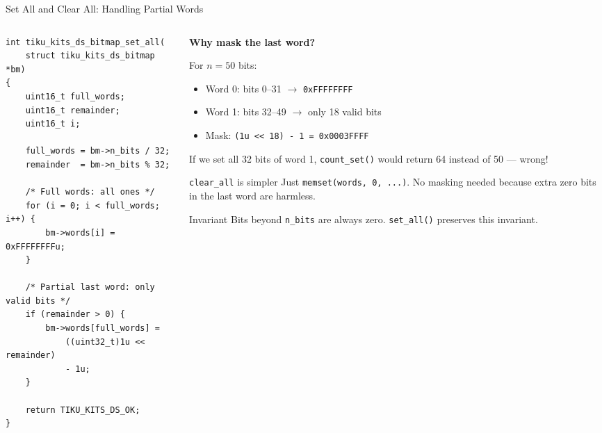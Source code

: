 \documentclass[aspectratio=169, 10pt]{beamer}
\begin{document}
\begin{frame}[fragile]{Set All and Clear All: Handling Partial Words}
\begin{columns}[T]
\begin{column}{0.48\textwidth}
\begin{lstlisting}[style=cstyle,
  title={set\_all --- masks the last word}]
int tiku_kits_ds_bitmap_set_all(
    struct tiku_kits_ds_bitmap *bm)
{
    uint16_t full_words;
    uint16_t remainder;
    uint16_t i;

    full_words = bm->n_bits / 32;
    remainder  = bm->n_bits % 32;

    /* Full words: all ones */
    for (i = 0; i < full_words; i++) {
        bm->words[i] = 0xFFFFFFFFu;
    }

    /* Partial last word: only valid bits */
    if (remainder > 0) {
        bm->words[full_words] =
            ((uint32_t)1u << remainder)
            - 1u;
    }

    return TIKU_KITS_DS_OK;
}
\end{lstlisting}
\end{column}

\begin{column}{0.48\textwidth}
\textbf{Why mask the last word?}

\vspace{0.3em}
For $n = 50$ bits:
\begin{itemize}
  \item Word 0: bits 0--31 $\rightarrow$ \texttt{0xFFFFFFFF}
  \item Word 1: bits 32--49 $\rightarrow$ only 18 valid bits
  \item Mask: \texttt{(1u << 18) - 1 = 0x0003FFFF}
\end{itemize}

\vspace{0.3em}
If we set all 32 bits of word 1, \texttt{count\_set()} would
return 64 instead of 50 --- wrong!

\vspace{0.5em}
\begin{block}{\texttt{clear\_all} is simpler}
Just \texttt{memset(words, 0, ...)}. No masking needed because
extra zero bits in the last word are harmless.
\end{block}

\vspace{0.3em}
\begin{alertblock}{Invariant}
Bits beyond \texttt{n\_bits} are always zero.
\texttt{set\_all()} preserves this invariant.
\end{alertblock}
\end{column}
\end{columns}
\end{frame}
\end{document}
